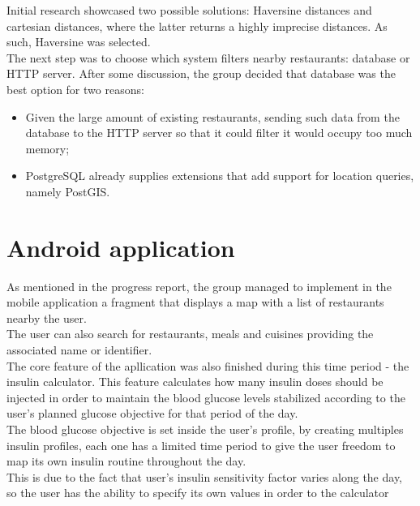 Initial research showcased two possible solutions: Haversine distances and cartesian distances, where the latter returns a highly imprecise distances.
As such, Haversine was selected.\\

The next step was to choose which system filters nearby restaurants: database or HTTP server. After some discussion, the group decided that database was the best
option for two reasons: 
\begin{itemize}
    \item Given the large amount of existing restaurants, sending such data from the database to the HTTP server so that it could filter it would occupy too much memory;
    \item PostgreSQL already supplies extensions that add support for location queries, namely PostGIS.
\end{itemize}

\section{Android application}

As mentioned in the progress report, the group managed to implement in the mobile application a fragment that displays a map with a list of restaurants nearby the user.\\

The user can also search for restaurants, meals and cuisines providing the associated name or identifier.\\

The core feature of the apllication was also finished during this time period - the insulin calculator. This feature calculates how many insulin doses should be injected
in order to maintain the blood glucose levels stabilized according to the user's planned glucose objective for that period of the day.\\

The blood glucose objective is set inside the user's profile, by creating multiples insulin profiles, each one has a limited time period to give the user freedom to map its
own insulin routine throughout the day.\\

This is due to the fact that user's insulin sensitivity factor varies along the day, so the user has the ability to specify its own values in order to the calculator\\